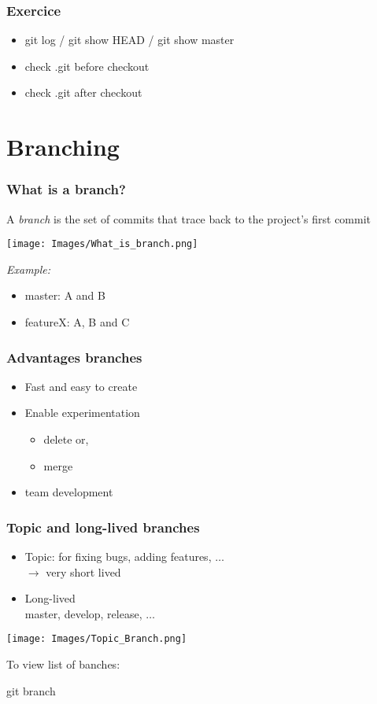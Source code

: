 \documentclass{beamer}
\begin{document}
	\begin{frame}[plain]
		\frametitle{Exercice}
		\begin{itemize}
			\item git log / git show HEAD / git show master
			\item check .git before checkout
			\item check .git after checkout
		\end{itemize}
	\end{frame}

	\section{Branching}
    \begin{frame}[plain]
		\frametitle{What is a branch?}
		A \textit{branch} is the set of commits that trace back to the project's first commit
		\begin{center}
			\texttt{[image: Images/What\_is\_branch.png]}
		\end{center}
		\textit{Example:}
		\begin{itemize}
			\item master: A and B
			\item featureX: A, B and C
		\end{itemize}
	\end{frame}	

	\begin{frame}[plain]
		\frametitle{Advantages branches}
		
		\begin{itemize}
			\item Fast and easy to create 
			\item Enable experimentation
					\begin{itemize}
						\item delete or, 
						\item merge
					\end{itemize}
			\item team development
		\end{itemize}
	
	\end{frame}

	\begin{frame}[plain]
		\frametitle{Topic and long-lived branches}
		\begin{itemize}
			\item Topic: for fixing bugs, adding features, $\dots$ \\
					$\rightarrow$ very short lived 
			\item Long-lived \\
				master, develop, release, $\dots$
		\end{itemize}
		\begin{center}
			\texttt{[image: Images/Topic\_Branch.png]}
		\end{center}

		To view list of banches:
			\begin{center}
				git branch
			\end{center}
		
	
	\end{frame}
\end{document}
